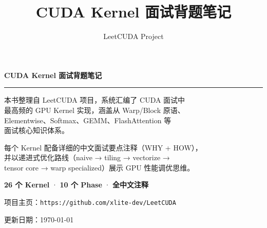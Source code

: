 \documentclass[9pt]{ctexart}
\title{CUDA Kernel 面试背题笔记}
\author{LeetCUDA Project}
\date{}
\begin{document}
\begin{titlepage}
\thispagestyle{empty}
\begin{center}
  \vspace*{5.0cm}
  {\fontsize{28pt}{36pt}\selectfont\bfseries CUDA Kernel 面试背题笔记}

  \vspace{0.5cm}
  \rule{0.6\textwidth}{0.5pt}

  \vspace{1.5cm}
  {\fontsize{12pt}{18pt}\selectfont
  本书整理自 LeetCUDA 项目，系统汇编了 CUDA 面试中 \\
  最高频的 GPU Kernel 实现，涵盖从 Warp/Block 原语、 \\
  Elementwise、Softmax、GEMM、FlashAttention 等 \\
  面试核心知识体系。

  \vspace{0.6cm}
  每个 Kernel 配备详细的中文面试要点注释（WHY + HOW）， \\
  并以递进式优化路线（naive → tiling → vectorize → \\
  tensor core → warp specialized）展示 GPU 性能调优思维。

  \vspace{0.6cm}
  \textbf{26 个 Kernel} · \textbf{10 个 Phase} · \textbf{全中文注释}
  }

  \vspace{2.5cm}
  {\fontsize{11pt}{16pt}\selectfont
   项目主页：\texttt{https://github.com/xlite-dev/LeetCUDA}
  }

  \vspace{0.3cm}
  {\fontsize{10pt}{14pt}\selectfont\color{gray}
   更新日期：\today
  }
\end{center}
\vfill
\end{titlepage}

\setcounter{page}{1}

\end{document}
